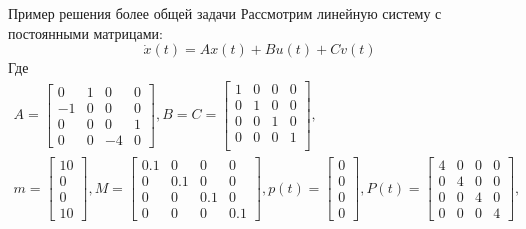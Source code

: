 \documentclass{beamer}
\begin{document}
\begin{frame}{Пример решения более общей задачи}
  \small
  Рассмотрим линейную систему с постоянными матрицами:
  \begin{equation*}
    \dot{x}(t) = Ax(t) + Bu(t) + Cv(t)
  \end{equation*}
  Где
  \footnotesize
  \begin{gather*}
    A = \begin{bmatrix}
        0 & 1 & 0 & 0 \\[0.3em]
        -1 & 0 & 0 & 0 \\[0.3em]
        0 & 0 & 0 & 1 \\[0.3em]
        0 & 0 & -4 & 0 
    \end{bmatrix},
    B = C = \begin{bmatrix}
        1 & 0 & 0 & 0 \\[0.3em]
        0 & 1 & 0 & 0 \\[0.3em]
        0 & 0 & 1 & 0 \\[0.3em]
        0 & 0 & 0 & 1 \\[0.3em]
    \end{bmatrix}, \\
    m = \begin{bmatrix}
        10 \\[0.3em]
        0 \\[0.3em]
        0 \\[0.3em]
        10
    \end{bmatrix},
    M = \begin{bmatrix}
        0.1 & 0 & 0 & 0 \\[0.3em]
        0 & 0.1 & 0 & 0 \\[0.3em]
        0 & 0 & 0.1 & 0 \\[0.3em]
        0 & 0 & 0 & 0.1
    \end{bmatrix},
    p(t) = \begin{bmatrix}
        0 \\[0.3em]
        0 \\[0.3em]
        0 \\[0.3em]
        0
    \end{bmatrix},
    P(t) = \begin{bmatrix}
        4 & 0 & 0 & 0 \\[0.3em]
        0 & 4 & 0 & 0 \\[0.3em]
        0 & 0 & 4 & 0 \\[0.3em]
        0 & 0 & 0 & 4
    \end{bmatrix}, \\

\end{gather*}
\end{frame}
\end{document}
